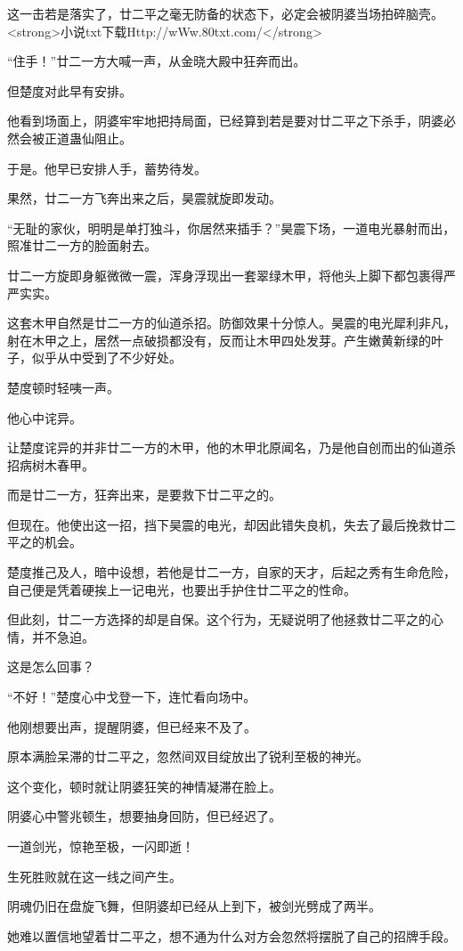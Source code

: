 \begin{this_body}
这一击若是落实了，廿二平之毫无防备的状态下，必定会被阴婆当场拍碎脑壳。<strong>小说txt下载Http://wWw.80txt.com/</strong>

“住手！”廿二一方大喊一声，从金晓大殿中狂奔而出。

但楚度对此早有安排。

他看到场面上，阴婆牢牢地把持局面，已经算到若是要对廿二平之下杀手，阴婆必然会被正道蛊仙阻止。

于是。他早已安排人手，蓄势待发。

果然，廿二一方飞奔出来之后，昊震就旋即发动。

“无耻的家伙，明明是单打独斗，你居然来插手？”昊震下场，一道电光暴射而出，照准廿二一方的脸面射去。

廿二一方旋即身躯微微一震，浑身浮现出一套翠绿木甲，将他头上脚下都包裹得严严实实。

这套木甲自然是廿二一方的仙道杀招。防御效果十分惊人。昊震的电光犀利非凡，射在木甲之上，居然一点破损都没有，反而让木甲四处发芽。产生嫩黄新绿的叶子，似乎从中受到了不少好处。

楚度顿时轻咦一声。

他心中诧异。

让楚度诧异的并非廿二一方的木甲，他的木甲北原闻名，乃是他自创而出的仙道杀招病树木春甲。

而是廿二一方，狂奔出来，是要救下廿二平之的。

但现在。他使出这一招，挡下昊震的电光，却因此错失良机，失去了最后挽救廿二平之的机会。

楚度推己及人，暗中设想，若他是廿二一方，自家的天才，后起之秀有生命危险，自己便是凭着硬挨上一记电光，也要出手护住廿二平之的性命。

但此刻，廿二一方选择的却是自保。这个行为，无疑说明了他拯救廿二平之的心情，并不急迫。

这是怎么回事？

“不好！”楚度心中戈登一下，连忙看向场中。

他刚想要出声，提醒阴婆，但已经来不及了。

原本满脸呆滞的廿二平之，忽然间双目绽放出了锐利至极的神光。

这个变化，顿时就让阴婆狂笑的神情凝滞在脸上。

阴婆心中警兆顿生，想要抽身回防，但已经迟了。

一道剑光，惊艳至极，一闪即逝！

生死胜败就在这一线之间产生。

阴魂仍旧在盘旋飞舞，但阴婆却已经从上到下，被剑光劈成了两半。

她难以置信地望着廿二平之，想不通为什么对方会忽然将摆脱了自己的招牌手段。


\end{this_body}

